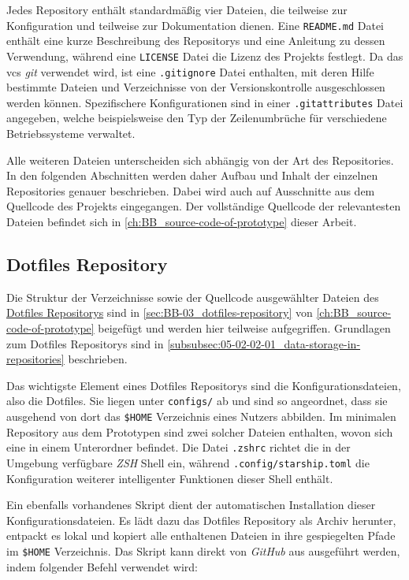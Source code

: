 Jedes Repository enthält standardmäßig vier Dateien, die teilweise zur Konfiguration und teilweise zur Dokumentation dienen. Eine \texttt{README.md} Datei enthält eine kurze Beschreibung des Repositorys und eine Anleitung zu dessen Verwendung, während eine \texttt{LICENSE} Datei die Lizenz des Projekts festlegt. Da das \Gls{vcs} \textit{\Gls{git}} verwendet wird, ist eine \texttt{.gitignore} Datei enthalten, mit deren Hilfe bestimmte Dateien und Verzeichnisse von der Versionskontrolle ausgeschlossen werden können. Spezifischere Konfigurationen sind in einer \texttt{.gitattributes} Datei angegeben, welche beispielsweise den Typ der Zeilenumbrüche für verschiedene Betriebssysteme verwaltet.

Alle weiteren Dateien unterscheiden sich abhängig von der Art des Repositories. In den folgenden Abschnitten werden daher Aufbau und Inhalt der einzelnen Repositories genauer beschrieben. Dabei wird auch auf Ausschnitte aus dem Quellcode des Projekts eingegangen. Der vollständige Quellcode der relevantesten Dateien befindet sich in \autoref{ch:BB_source-code-of-prototype} dieser Arbeit.

\subsection{Dotfiles Repository}
\label{subsec:06-02-01_dotfiles-repository}

Die Struktur der Verzeichnisse sowie der Quellcode ausgewählter Dateien des \hyperref[sec:BB-03_dotfiles-repository]{Dotfiles Repositorys} sind in \autoref{sec:BB-03_dotfiles-repository} von \autoref{ch:BB_source-code-of-prototype} beigefügt und werden hier teilweise aufgegriffen. Grundlagen zum Dotfiles Repositorys sind in \autoref{subsubsec:05-02-02-01_data-storage-in-repositories} beschrieben.

Das wichtigste Element eines Dotfiles Repositorys sind die Konfigurationsdateien, also die Dotfiles. Sie liegen unter \texttt{configs/} ab und sind so angeordnet, dass sie ausgehend von dort das \texttt{\$HOME} Verzeichnis eines Nutzers abbilden. Im minimalen Repository aus dem Prototypen sind zwei solcher Dateien enthalten, wovon sich eine in einem Unterordner befindet. Die Datei \texttt{.zshrc} richtet die in der Umgebung verfügbare \textit{ZSH} Shell ein, während \texttt{.config/starship.toml} die Konfiguration weiterer intelligenter Funktionen dieser Shell enthält.

Ein ebenfalls vorhandenes Skript  dient der automatischen Installation dieser Konfigurationsdateien. Es lädt dazu das Dotfiles Repository als Archiv herunter, entpackt es lokal und kopiert alle enthaltenen Dateien in ihre gespiegelten Pfade im \texttt{\$HOME} Verzeichnis. Das Skript kann direkt von \textit{GitHub} aus ausgeführt werden, indem folgender Befehl verwendet wird:

